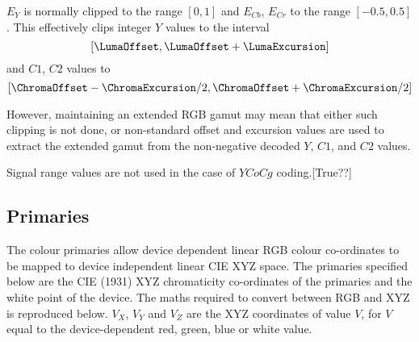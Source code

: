 \begin{informative*}
$E_Y$ is normally clipped to the range $[0,1]$ and $E_{Cb}$, $E_{Cr}$
to the range $[-0.5,0.5]$. This effectively clips integer $Y$ values to 
the interval
\[ [\LumaOffset,\LumaOffset+\LumaExcursion] \]
and $C1$, $C2$ values to
\[ [\ChromaOffset-\ChromaExcursion/2,\ChromaOffset+\ChromaExcursion/2] \]

However, maintaining an extended RGB gamut may mean that either such
clipping is not done, or non-standard offset and excursion values are
used to extract the extended gamut from the non-negative decoded $Y$, $C1$,
and $C2$ values.

Signal range values are not used in the case of $YCoCg$ coding.[True??]

\begin{comment}
Non-default offset and excursion values cannot be coded if the chroma
format is YCoCg: default parameters should be used. However, even in
this case, EY, ECo, and ECg should not be calculated. Instead, direct
integer conversion to RGB should be done as described in Section . (In
fact, excursion values will be ignored in this integer conversion.)
\end{comment}

\subsection{Primaries}
\label{primaries}
The colour primaries allow device dependent linear RGB colour
co-ordinates to be mapped to device independent linear CIE XYZ space.
The primaries specified below are the CIE (1931) XYZ chromaticity
co-ordinates of the primaries and the white point of the device. The
maths required to convert between RGB and XYZ is reproduced below. $V_X$,
$V_Y$ and $V_Z$ are the XYZ coordinates of value $V$, for $V$ equal to
the device-dependent red, green, blue or white value.


\end{informative*}
